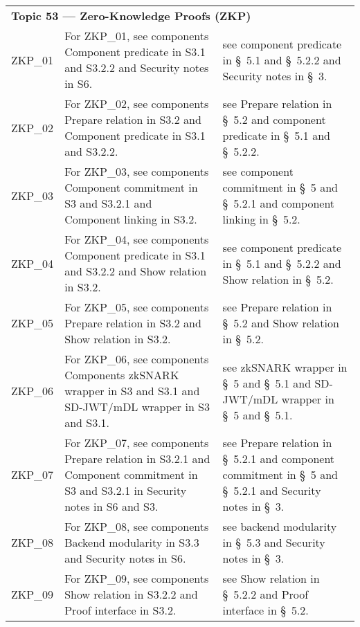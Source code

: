 \begin{landscape}
\begin{longtable}{p{3cm} p{10cm} p{7cm}}
\multicolumn{3}{l}{\textbf{Topic 53 — Zero-Knowledge Proofs (ZKP)}}\\

ZKP\_01 &
For ZKP\_01, see components Component predicate in S3.1 and S3.2.2 and Security notes in S6. &
see component predicate in \S~5.1 and \S~5.2.2 and Security notes in \S~3. \\

ZKP\_02 &
For ZKP\_02, see components Prepare relation in S3.2 and Component predicate in S3.1 and S3.2.2. &
see Prepare relation in \S~5.2 and component predicate in \S~5.1 and \S~5.2.2. \\

ZKP\_03 &
For ZKP\_03, see components Component commitment in S3 and S3.2.1 and Component linking in S3.2. &
see component commitment in \S~5 and \S~5.2.1 and component linking in \S~5.2. \\

ZKP\_04 &
For ZKP\_04, see components Component predicate in S3.1 and S3.2.2 and Show relation in S3.2. &
see component predicate in \S~5.1 and \S~5.2.2 and Show relation in \S~5.2. \\

ZKP\_05 &
For ZKP\_05, see components Prepare relation in S3.2 and Show relation in S3.2. &
see Prepare relation in \S~5.2 and Show relation in \S~5.2. \\

ZKP\_06 &
For ZKP\_06, see components Components zkSNARK wrapper in S3 and S3.1 and SD-JWT/mDL wrapper in S3 and S3.1. &
see zkSNARK wrapper in \S~5 and \S~5.1 and SD-JWT/mDL wrapper in \S~5 and \S~5.1. \\

ZKP\_07 &
For ZKP\_07, see components Prepare relation in S3.2.1 and Component commitment in S3 and S3.2.1 in Security notes in S6 and S3. &
see Prepare relation in \S~5.2.1 and component commitment in \S~5 and \S~5.2.1 and Security notes in \S~3. \\

ZKP\_08 &
For ZKP\_08, see components Backend modularity in S3.3 and Security notes in S6. &
see backend modularity in \S~5.3 and Security notes in \S~3. \\

ZKP\_09 &
For ZKP\_09, see components Show relation in S3.2.2 and Proof interface in S3.2. &
see Show relation in \S~5.2.2 and Proof interface in \S~5.2. \\

\end{longtable}
\end{landscape}





